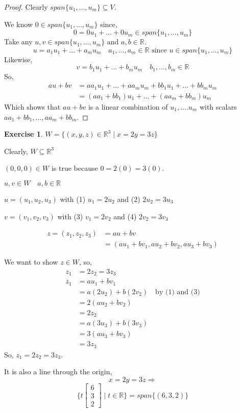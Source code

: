 \documentclass{report}
\theoremstyle{definition}
\newtheorem{_exc}{Exercise}
\begin{document}
\begin{proof}
Clearly $span\{u_1,...,u_m\}\subseteq V$.

We know $0\in span\{u_1,...,u_m\}$ since,
\[0=0u_1+...+0u_m\in span\{u_1,...,u_m\}\]
Take any $u,v\in span\{u_1,...,u_m\}$ and $a,b\in \mathbb{R}$.
\[u=a_1u_1+...+a_mu_m \quad a_1,...,a_m\in\mathbb{R}\text{ since } u\in span\{u_1,...,u_m\}\]
Likewise,
\[v=b_1u_1+...+b_mu_m \quad b_1,...,b_m\in\mathbb{R}\]
So,
\begin{align*}
au+bv&=aa_1u_1+...+aa_mu_m+bb_1u_1+...+bb_mu_m \\
&=(aa_1+bb_1)u_1+...+(aa_m+bb_m)u_m
\end{align*}
Which shows that $au+bv$ is a linear combination of $u_1,....u_m$ with scalars $aa_1+bb_1,...,aa_m+bb_m$.
\end{proof}

\begin{_exc}
$W=\{(x,y,z)\in \mathbb{R}^3\mid x=2y=3z\}$

Clearly, $W\subseteq \mathbb{R}^3$

$(0,0,0)\in W$ is true because $0=2(0)=3(0)$.

$u,v\in W\quad a,b\in \mathbb{R}$

$u=(u_1,u_2,u_3)$ with (1) $u_1=2u_2$ and (2) $2u_2=3u_3$

$v=(v_1,v_2,v_3)$ with (3) $v_1=2v_2$ and (4) $2v_2=3v_3$

\begin{align*}
z=(z_1,z_2,z_3)&=au+bv \\
&=(au_1+bv_1,au_2+bv_2,au_3+bv_3)
\end{align*}

We want to show $z\in W$, so,
\begin{align*}
z_1&=2z_2=3z_3 \\
z_1&=au_1+bv_1 \\
&=a(2u_2)+b(2v_2) \quad \text{by (1) and (3)}\\
&=2(au_2+bv_2) \\
&=2z_2 \\
&=a(3u_3)+b(3v_3) \\
&=3(au_3+bv_3) \\
&=3z_3
\end{align*}
So, $z_1=2z_2=3z_3$.

It is also a line through the origin,
\[x=2y=3z\Rightarrow\]
\[\{t\begin{bmatrix}
6 \\ 3 \\ 2
\end{bmatrix}\mid t\in \mathbb{R}\}=span\{(6,3,2)\}\]
\end{_exc}
\end{document}
